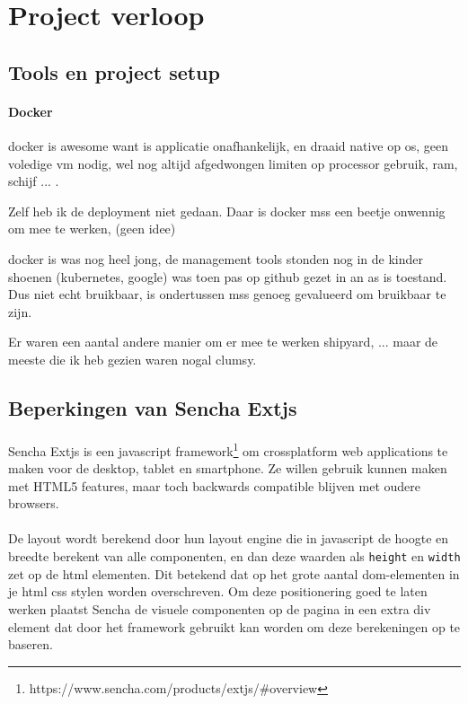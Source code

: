 \section {Project verloop}

\subsection {Tools en project setup}

\paragraph {Docker} docker is awesome want is applicatie onafhankelijk, en draaid native
op os, geen voledige vm nodig, wel nog altijd afgedwongen limiten op processor gebruik,
ram, schijf ... .

Zelf heb ik de deployment niet gedaan. Daar is docker mss een beetje onwennig om mee te
werken, (geen idee)

docker is was nog heel jong, de management tools stonden nog in de kinder shoenen
(kubernetes, google) was toen pas op github gezet in an as is toestand. Dus niet echt
bruikbaar, is ondertussen mss genoeg gevalueerd om bruikbaar te zijn.

Er waren een aantal andere manier om er mee te werken shipyard, ... maar de meeste die ik
heb gezien waren nogal clumsy.


\subsection {Beperkingen van Sencha Extjs}

\paragraph {} Sencha Extjs is een javascript
framework\footnote{https://www.sencha.com/products/extjs/\#overview} om crossplatform web
applications te maken voor de desktop, tablet en smartphone. Ze willen gebruik kunnen maken
met HTML5 features, maar toch backwards compatible blijven met oudere browsers.

\paragraph {} De layout wordt berekend door hun layout engine die in javascript de hoogte
en breedte berekent van alle componenten, en dan deze waarden als \lstinline{height} en
\lstinline{width} zet op de html elementen. Dit betekend dat op het grote aantal dom-elementen
in je html css stylen worden overschreven. Om deze positionering goed te laten
werken plaatst Sencha de visuele componenten op de pagina in een extra div element dat door het
framework gebruikt kan worden om deze berekeningen op te baseren.

